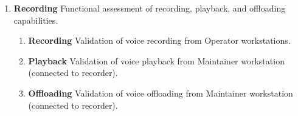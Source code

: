 \begin{enumerate}[itemindent=5pt,topsep=0pt,itemsep=0pt,partopsep=0pt, parsep=0pt]
	\item {\bf Recording} Functional assessment of recording, playback, and offloading capabilities.
	\begin{enumerate}[itemindent=5pt,topsep=0pt,itemsep=0pt,partopsep=0pt, parsep=0pt]
		\item {\bf Recording} Validation of voice recording from Operator workstations.
		\item {\bf Playback} Validation of voice playback from Maintainer workstation (\KVM connected to recorder).
		\item {\bf Offloading} Validation of voice offloading from Maintainer workstation (\KVM connected to recorder).
	\end{enumerate}
	
\end{enumerate}